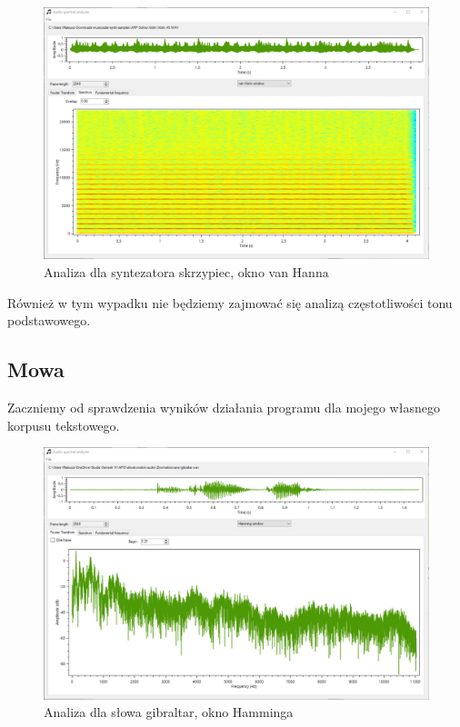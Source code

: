 \documentclass{article}
\begin{document}
\begin{figure}[H]
\includegraphics[width=6in]{scr8.png}
\centering
\caption{Analiza dla syntezatora skrzypiec, okno van Hanna}
\end{figure}

Również w tym wypadku nie będziemy zajmować się analizą częstotliwości tonu podstawowego.

\subsection{Mowa}

Zaczniemy od sprawdzenia wyników działania programu dla mojego własnego korpusu tekstowego.

\begin{figure}[H]
\includegraphics[width=6in]{scr9.png}
\centering
\caption{Analiza dla słowa gibraltar, okno Hamminga}
\end{figure}
\end{document}
